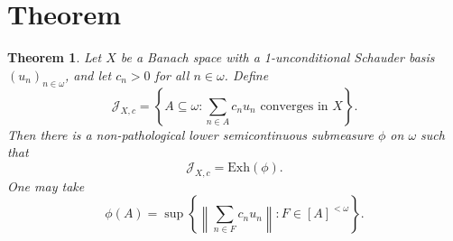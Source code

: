 \documentclass[11pt]{article}
\newtheorem{theorem}{Theorem}
\newcommand{\Exh}{\mathrm{Exh}}
\begin{document}
\section*{Theorem}

\begin{theorem}
Let \(X\) be a Banach space with a 1-unconditional Schauder basis
\((u_n)_{n\in\omega}\), and let \(c_n>0\) for all \(n\in\omega\).  Define
\[
  \mathcal J_{X,c}
  =
  \left\{A\subseteq\omega:
  \sum_{n\in A} c_n u_n \text{ converges in }X
  \right\}.
\]
Then there is a non-pathological lower semicontinuous submeasure \(\phi\) on
\(\omega\) such that
\[
  \mathcal J_{X,c}=\Exh(\phi).
\]
One may take
\[
  \phi(A)=
  \sup\left\{
  \left\|\sum_{n\in F} c_n u_n\right\|:
  F\in[A]^{<\omega}
  \right\}.
\]
\end{theorem}
\end{document}
